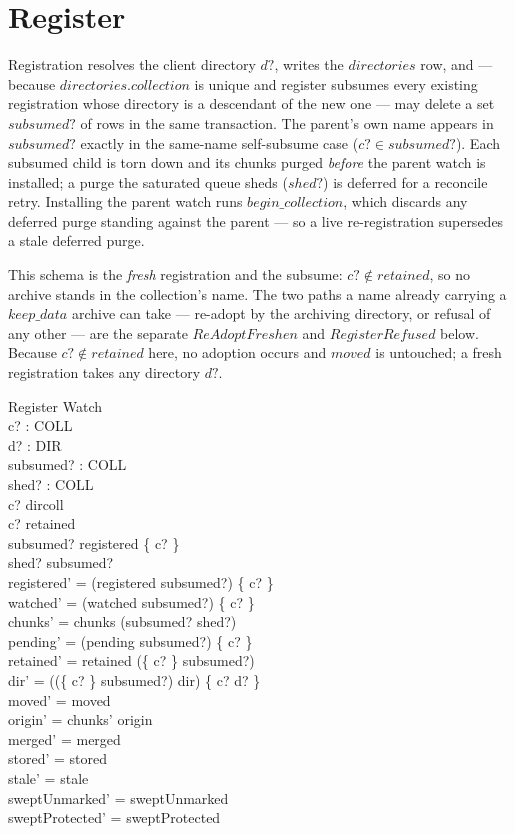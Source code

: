 \documentclass[a4paper]{article}
\begin{document}
\section{Register}

Registration resolves the client directory $d?$, writes the $directories$ row,
and --- because $directories.collection$ is unique and register subsumes every
existing registration whose directory is a descendant of the new one --- may
delete a set $subsumed?$ of rows in the same transaction.  The parent's own name
appears in $subsumed?$ exactly in the same-name self-subsume case ($c? \in
subsumed?$).  Each subsumed child is torn down and its chunks purged
\textit{before} the parent watch is installed; a purge the saturated queue sheds
($shed?$) is deferred for a reconcile retry.  Installing the parent watch runs
$begin\_collection$, which discards any deferred purge standing against the
parent --- so a live re-registration supersedes a stale deferred purge.

This schema is the \textit{fresh} registration and the subsume: $c? \notin
retained$, so no archive stands in the collection's name.  The two paths a name
already carrying a $keep\_data$ archive can take --- re-adopt by the archiving
directory, or refusal of any other --- are the separate $ReAdoptFreshen$ and
$RegisterRefused$ below.  Because $c? \notin retained$ here, no adoption occurs
and $moved$ is untouched; a fresh registration takes any directory $d?$.

\begin{schema}{Register}
  \Delta Watch \\
  c? : COLL \\
  d? : DIR \\
  subsumed? : \power COLL \\
  shed? : \power COLL \\
  \where
  c? \in dircoll \\
  c? \notin retained \\
  subsumed? \subseteq registered \cup \{ c? \} \\
  shed? \subseteq subsumed? \\
  registered' = (registered \setminus subsumed?) \cup \{ c? \} \\
  watched' = (watched \setminus subsumed?) \cup \{ c? \} \\
  chunks' = chunks \setminus (subsumed? \setminus shed?) \\
  pending' = (pending \cup subsumed?) \setminus \{ c? \} \\
  retained' = retained \setminus (\{ c? \} \cup subsumed?) \\
  dir' = ((\{ c? \} \cup subsumed?) \ndres dir) \cup \{ c? \mapsto d? \} \\
  moved' = moved \\
  origin' = chunks' \dres origin \\
  merged' = merged \\
  stored' = stored \\
  stale' = stale \\
  sweptUnmarked' = sweptUnmarked \\
  sweptProtected' = sweptProtected
\end{schema}
\end{document}
